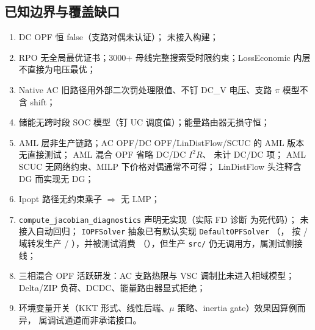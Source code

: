 \subsection{已知边界与覆盖缺口}
\begin{enumerate}
  \item DC OPF  恒 false（支路对偶未认证）；
        未接入构建；
  \item RPO 无全局最优证书；3000+ 母线完整搜索受时限约束；LossEconomic 内层
        不直接为电压最优；
  \item Native AC 旧路径用外部二次罚处理限值、不钉 DC\_V 电压、支路 $\pi$ 模型不含 shift；
  \item 储能无跨时段 SOC 模型（钉 UC 调度值）；能量路由器无损守恒；
  \item AML 层非生产链路；AC OPF/DC OPF/LinDistFlow/SCUC 的 AML 版本无直接测试；
        AML 混合 OPF 省略 DC/DC $I^2R$、 未计 DC/DC 项；
        AML SCUC 无网络约束、MILP 下价格对偶通常不可得；
        LinDistFlow 头注释含 DG 而实现无 DG；
  \item Ipopt 路径无约束乘子 $\Rightarrow$ 无 LMP；
  \item \texttt{compute\_jacobian\_diagnostics} 声明无实现（实际 FD 诊断
         为死代码）；
         未接入自动回归；
        \texttt{IOPFSolver} 抽象已有默认实现 \texttt{DefaultOPFSolver}
        （，
        按 / 域转发生产 /%
        ），并被测试消费
        （），但生产 \texttt{src/}
        仍无调用方，属测试侧接线；
  \item 三相混合 OPF 活跃研发：AC 支路热限与 VSC 调制比未进入相域模型；
        Delta/ZIP 负荷、DCDC、能量路由器显式拒绝；
  \item 环境变量开关（KKT 形式、线性后端、$\mu$ 策略、inertia gate）效果因算例而异，
        属调试通道而非承诺接口。
\end{enumerate}

